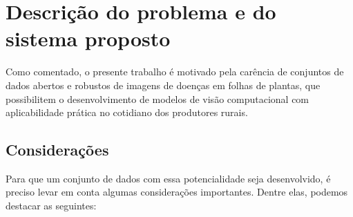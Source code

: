 \chapter{Descrição do problema e do sistema proposto}
Como comentado, o presente trabalho é motivado pela carência de conjuntos de dados abertos e robustos de imagens de doenças em folhas de plantas, que possibilitem o desenvolvimento de modelos de visão computacional com aplicabilidade prática no cotidiano dos produtores rurais.

\section{Considerações}
Para que um conjunto de dados com essa potencialidade seja desenvolvido, é preciso levar em conta algumas considerações importantes. Dentre elas, podemos destacar as seguintes:

